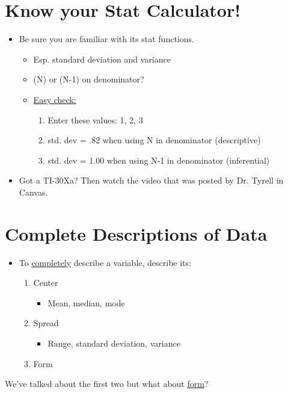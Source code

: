 \documentclass[11pt]{report}
\begin{document}
\section{Know your Stat Calculator!}
\begin{itemize}
    \item Be sure you are familiar with its stat functions.
    \begin{itemize}
        \item Esp. standard deviation and variance
        \item (N) or (N-1) on denominator?
        \item \underline{Easy check:}
        \begin{enumerate}
            \item Enter these values: {1, 2, 3}
            \item std. dev = .82 when using N in denominator (descriptive)
            \item std. dev = 1.00 when using N-1 in denominator (inferential)
        \end{enumerate}
    \end{itemize}
    \item Got a TI-30Xa? Then watch the video that was posted by Dr. Tyrell in Canvas.
\end{itemize}

\section{Complete Descriptions of Data}
\begin{itemize}
    \item To \underline{completely} describe a variable, describe its:
    \begin{enumerate}
        \item Center 
        \begin{itemize}
            \item Mean, median, mode
        \end{itemize}
        \item Spread
        \begin{itemize}
            \item Range, standard deviation, variance
        \end{itemize}
        \item Form 
    \end{enumerate}
\end{itemize}
We've talked about the first two but what about \underline{form}?
\end{document}
